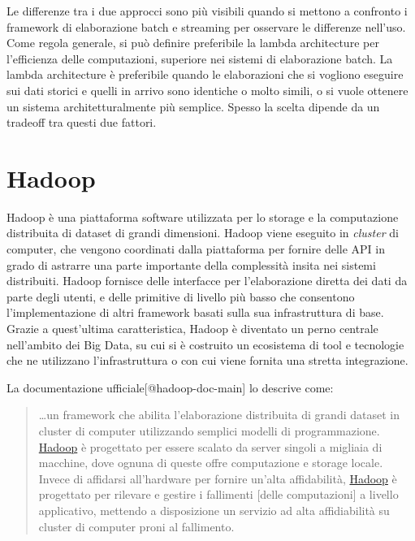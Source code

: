 \documentclass[italian,a4paper, twoside, 12pt]{report}
\begin{document}
Le differenze tra i due approcci sono più visibili quando si mettono a
confronto i framework di elaborazione batch e streaming per osservare le
differenze nell'uso. Come regola generale, si può definire preferibile
la lambda architecture per l'efficienza delle computazioni, superiore
nei sistemi di elaborazione batch. La lambda architecture è preferibile
quando le elaborazioni che si vogliono eseguire sui dati storici e
quelli in arrivo sono identiche o molto simili, o si vuole ottenere un
sistema architetturalmente più semplice. Spesso la scelta dipende da un
tradeoff tra questi due fattori.

\hypertarget{hadoop}{\chapter{Hadoop}\label{hadoop}}

Hadoop è una piattaforma software utilizzata per lo storage e la
computazione distribuita di dataset di grandi dimensioni. Hadoop viene
eseguito in \emph{cluster} di computer, che vengono coordinati dalla
piattaforma per fornire delle API in grado di astrarre una parte
importante della complessità insita nei sistemi distribuiti. Hadoop
fornisce delle interfacce per l'elaborazione diretta dei dati da parte
degli utenti, e delle primitive di livello più basso che consentono
l'implementazione di altri framework basati sulla sua infrastruttura di
base. Grazie a quest'ultima caratteristica, Hadoop è diventato un perno
centrale nell'ambito dei Big Data, su cui si è costruito un ecosistema
di tool e tecnologie che ne utilizzano l'infrastruttura o con cui viene
fornita una stretta integrazione.

La documentazione ufficiale{[}@hadoop-doc-main{]} lo descrive come:

\begin{quote}
\ldots{}un framework che abilita l'elaborazione distribuita di grandi
dataset in cluster di computer utilizzando semplici modelli di
programmazione. \protect\hyperlink{hadoop}{Hadoop} è progettato per
essere scalato da server singoli a migliaia di macchine, dove ognuna di
queste offre computazione e storage locale. Invece di affidarsi
all'hardware per fornire un'alta affidabilità,
\protect\hyperlink{hadoop}{Hadoop} è progettato per rilevare e gestire i
fallimenti {[}delle computazioni{]} a livello applicativo, mettendo a
disposizione un servizio ad alta affidiabilità su cluster di computer
proni al fallimento.
\end{quote}
\end{document}
